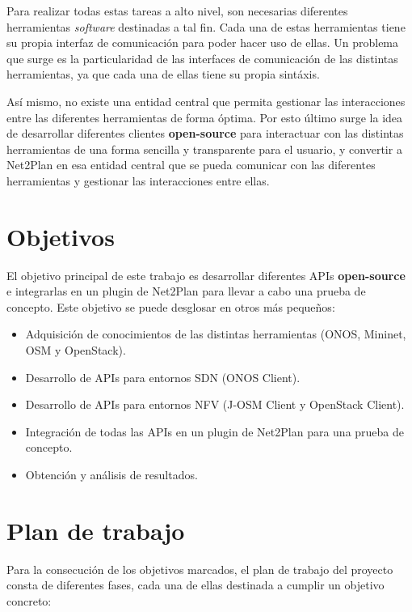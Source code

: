 Para realizar todas estas tareas a alto nivel, son necesarias diferentes herramientas \textit{software} destinadas a tal fin. Cada una de estas herramientas tiene su propia interfaz de comunicación para poder hacer uso de ellas. Un problema que surge es la particularidad de las interfaces de comunicación de las distintas herramientas, ya que cada una de ellas tiene su propia sintáxis.

Así mismo, no existe una entidad central que permita gestionar las interacciones entre las diferentes herramientas de forma óptima. Por esto último surge la idea de desarrollar diferentes clientes \textbf{open-source} para interactuar con las distintas herramientas de una forma sencilla y transparente para el usuario, y convertir a Net2Plan en esa entidad central que se pueda comunicar con las diferentes herramientas y gestionar las interacciones entre ellas.

\section{Objetivos}

El objetivo principal de este trabajo es desarrollar diferentes APIs \textbf{open-source} e integrarlas en un plugin de Net2Plan para llevar a cabo una prueba de concepto. Este objetivo se puede desglosar en otros más pequeños:

\begin{itemize}
	\item Adquisición de conocimientos de las distintas herramientas (ONOS, Mininet, OSM y OpenStack). 
	\item Desarrollo de APIs para entornos SDN (ONOS Client).
	\item Desarrollo de APIs para entornos NFV (J-OSM Client y OpenStack Client).
	\item Integración de todas las APIs en un plugin de Net2Plan para una prueba de concepto.
	\item Obtención y análisis de resultados.
\end{itemize}

\section{Plan de trabajo}

Para la consecución de los objetivos marcados, el plan de trabajo del proyecto consta de diferentes fases, cada una de ellas destinada a cumplir un objetivo concreto:


